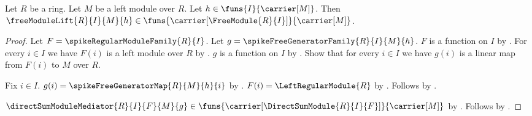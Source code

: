 \begin{proposition}\label{spike_free_module_lift_type}
    Let $R$ be a ring.
    Let $M$ be a left module over $R$.
    Let $h\in\funs{I}{\carrier[M]}$.
    Then
        $\freeModuleLift{R}{I}{M}{h}\in
            \funs{\carrier[\FreeModule{R}{I}]}{\carrier[M]}$.
\end{proposition}
\begin{proof}
    Let $F=\spikeRegularModuleFamily{R}{I}$.
    Let $g=\spikeFreeGeneratorFamily{R}{I}{M}{h}$.
    $F$ is a function on $I$ by
        .
    For every $i\in I$ we have $F(i)$ is a left module over $R$ by
        .
    $g$ is a function on $I$ by
        .
    Show that for every $i\in I$ we have
        $g(i)$ is a linear map from $F(i)$ to $M$ over $R$.
    \begin{subproof}
        Fix $i\in I$.
        $g(i)=\spikeFreeGeneratorMap{R}{M}{h}{i}$ by
            .
        $F(i)=\LeftRegularModule{R}$ by
            .
        Follows by .
    \end{subproof}
    $\directSumModuleMediator{R}{I}{F}{M}{g}\in
        \funs{\carrier[\DirectSumModule{R}{I}{F}]}{\carrier[M]}$ by
        .
    Follows by .
\end{proof}

